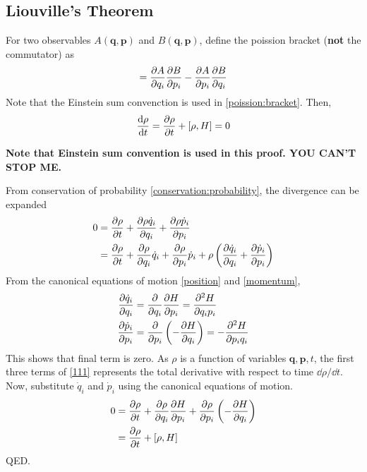 \documentclass{article}
\newcommand{\ve}{\mathbf}
\begin{document}
\subsection{Liouville's Theorem}
\begin{theorem}
    For two observables $A(\ve q,\ve p)$ and $B(\ve q,\ve p)$, define the poission bracket (\textbf{not} the commutator) as 
    \begin{equation}
        [A,B]=\partialderivative{A}{q_i}\partialderivative{B}{p_i}-\partialderivative{A}{p_i}\partialderivative{B}{q_i}\label{poission:bracket}
    \end{equation}
    Note that the Einstein sum convenction is used in \eqref{poission:bracket}. Then,
    \begin{equation}
        \derivative{\rho}{t}=\partialderivative{\rho}{t}+[\rho,H]=0
    \end{equation}
\end{theorem}
\begin{prooof}
    \textbf{Note that Einstein sum convention is used in this proof. YOU CAN'T STOP ME.}

    From conservation of probability \eqref{conservation:probability}, the divergence can be expanded
    \begin{align}
        0&=\partialderivative{\rho}{t}+\partialderivative{\rho \dot q_i}{q_i}+\partialderivative{\rho \dot p_i}{p_i}\\
        &=\partialderivative{\rho}{t}+\partialderivative{\rho}{q_i}\dot q_i+\partialderivative{\rho}{p_i}\dot p_i+\rho\left(\partialderivative{\dot q_i}{q_i}+\partialderivative{\dot p_i}{p_i}\right)\label{111}
    \end{align}
    From the canonical equations of motion \eqref{position} and \eqref{momentum}, 
    \begin{align}
        \partialderivative{\dot q_i}{q_i}&=\partialderivative{}{q_i}\partialderivative{H}{p_i}=\partialderivative{^2H}{q_ip_i}\\
        \partialderivative{\dot p_i}{p_i}&=\partialderivative{}{p_i}\left(-\partialderivative{H}{q_i}\right)=-\partialderivative{^2H}{p_iq_i}
    \end{align}
    This shows that final term is zero. As $\rho$ is a function of variables $\ve q,\ve p, t$, the first three terms of \eqref{111} represents the total derivative with respect to time $\dd\rho/\dd t$. Now, substitute $\dot q_i$ and $\dot p_i$ using the canonical equations of motion.
    \begin{align}
        0&=\partialderivative{\rho}{t}+\partialderivative{\rho}{q_i}\partialderivative{H}{p_i}+\partialderivative{\rho}{p_i}\left(-\partialderivative{H}{q_i}\right)\\
        &=\partialderivative{\rho}{t}+[\rho,H]
    \end{align}
    QED.
\end{prooof}
\end{document}
